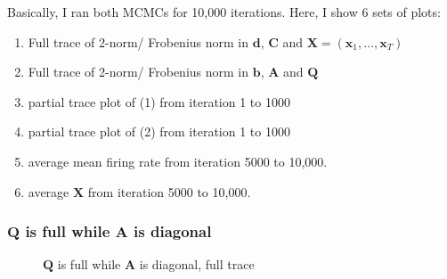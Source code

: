 \documentclass[]{article}
\begin{document}
Basically, I ran both MCMCs for 10,000 iterations. Here, I show 6 sets of plots:
\begin{enumerate}
	\def\labelenumi{(\arabic{enumi})}
	\item
	Full trace of  2-norm/ Frobenius norm in $\bm{d}$, $\bm{C}$ and $\mathbf{X} = (\mathbf{x}_{1},\ldots,\mathbf{x}_{T})$
	\item
	Full trace of 2-norm/ Frobenius norm in $\mathbf{b}$, $\mathbf{A}$ and $\mathbf{Q}$ 
	\item
	partial trace plot of (1) from iteration 1 to 1000
	\item
	partial trace plot of (2) from iteration 1 to 1000
	\item
	average mean firing rate from iteration 5000 to 10,000.
	\item
	average $\mathbf{X}$ from iteration 5000 to 10,000.
\end{enumerate}

\subsubsection{\(\mathbf{Q}\) is full while \(\mathbf{A}\) is diagonal}
\begin{figure}[h!]
	\caption{\(\mathbf{Q}\) is full while \(\mathbf{A}\) is diagonal, full trace}
	\label{full trace, diag A}
\end{figure}
\end{document}
